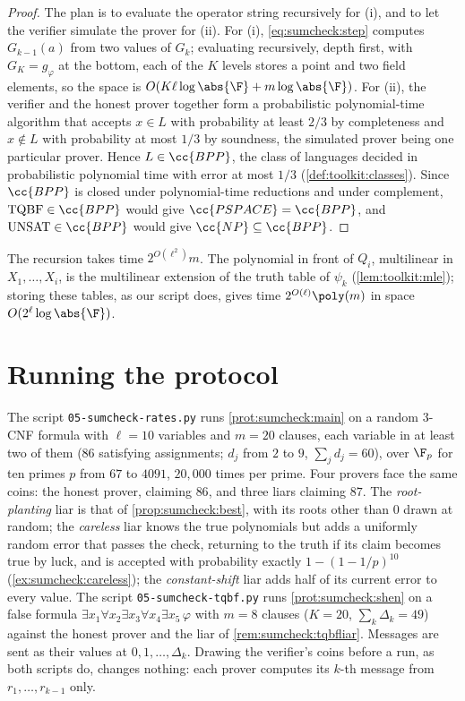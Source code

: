 \begin{refsection}
\begin{proof}
The plan is to evaluate the operator string recursively for (i), and to let the verifier simulate the prover for (ii). For (i), \eqref{eq:sumcheck:step} computes $G_{k-1}(a)$ from two values of $G_k$; evaluating recursively, depth first, with $G_K=g_\varphi$ at the bottom, each of the $K$ levels stores a point and two field elements, so the space is $O(K\ell\log\abs{\F}+m\log\abs{\F})$. For (ii), the verifier and the honest prover together form a probabilistic polynomial-time algorithm that accepts $x\in L$ with probability at least $2/3$ by completeness and $x\notin L$ with probability at most $1/3$ by soundness, the simulated prover being one particular prover. Hence $L\in\cc{BPP}$, the class of languages decided in probabilistic polynomial time with error at most $1/3$ (\cref{def:toolkit:classes}). Since $\cc{BPP}$ is closed under polynomial-time reductions and under complement, $\sumchecktqbf\in\cc{BPP}$ would give $\cc{PSPACE}=\cc{BPP}$, and $\sumcheckunsat\in\cc{BPP}$ would give $\cc{NP}\subseteq\cc{BPP}$.
\end{proof}

The recursion takes time $2^{O(\ell^2)}m$. The polynomial in front of $Q_i$, multilinear in $X_1,\dots,X_i$, is the multilinear extension of the truth table of $\psi_k$ (\cref{lem:toolkit:mle}); storing these tables, as our script does, gives time $2^{O(\ell)}\poly(m)$ in space $O(2^\ell\log\abs{\F})$.

\section{Running the protocol}\label{sec:sumcheck:running}

The script \texttt{05-sumcheck-rates.py} runs \cref{prot:sumcheck:main} on a random 3-CNF formula with $\ell=10$ variables and $m=20$ clauses, each variable in at least two of them ($86$ satisfying assignments; $d_j$ from $2$ to $9$, $\sum_jd_j=60$), over $\F_p$ for ten primes $p$ from $67$ to $4091$, $20{,}000$ times per prime. Four provers face the same coins: the honest prover, claiming $86$, and three liars claiming $87$. The \emph{root-planting} liar is that of \cref{prop:sumcheck:best}, with its roots other than $0$ drawn at random; the \emph{careless} liar knows the true polynomials but adds a uniformly random error that passes the check, returning to the truth if its claim becomes true by luck, and is accepted with probability exactly $1-(1-1/p)^{10}$ (\cref{ex:sumcheck:careless}); the \emph{constant-shift} liar adds half of its current error to every value. The script \texttt{05-sumcheck-tqbf.py} runs \cref{prot:sumcheck:shen} on a false formula $\exists x_1\forall x_2\exists x_3\forall x_4\exists x_5\,\varphi$ with $m=8$ clauses ($K=20$, $\sum_k\Delta_k=49$) against the honest prover and the liar of \cref{rem:sumcheck:tqbfliar}. Messages are sent as their values at $0,1,\dots,\Delta_k$. Drawing the verifier's coins before a run, as both scripts do, changes nothing: each prover computes its $k$-th message from $r_1,\dots,r_{k-1}$ only.


\end{refsection}
